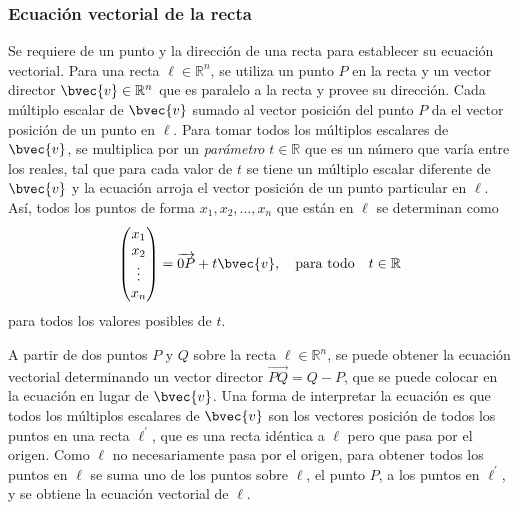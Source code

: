 \documentclass{fmbnotes}
\begin{document}
\subsubsection{Ecuación vectorial de la recta}
Se requiere de un punto y la dirección de una recta para establecer su ecuación vectorial. Para una recta \(\ell \in \mathbb{R}^{n}\), se utiliza un punto \(P\) en la recta y un vector director \(\bvec{v}\in \mathbb{R}^{n}\) que es paralelo a la recta y provee su dirección. Cada múltiplo escalar de \(\bvec{v}\) sumado al vector posición del punto \(P\) da el vector posición de un punto en \(\ell\). Para tomar todos los múltiplos escalares de \(\bvec{v}\), se multiplica por un \emph{parámetro} \(t \in \mathbb{R}\) que es un número que varía entre los reales, tal que para cada valor de \(t\) se tiene un múltiplo escalar diferente de \(\bvec{v}\) y la ecuación arroja el vector posición de un punto particular en \(\ell\). Así, todos los puntos de forma \(x_1, x_2, \ldots, x_n\) que están en \(\ell\) se determinan como
\[\begin{pmatrix}
x_1 \\ x_2 \\ \vdots \\ x_n
\end{pmatrix} =\overrightarrow{0P}+t \bvec{v}, \quad \text{para todo} \quad t \in \mathbb{R}\]
para todos los valores posibles de \(t\).

A partir de dos puntos \( P \) y \( Q \) sobre la recta \( \ell \in \mathbb{R}^{n} \), se puede obtener la ecuación vectorial determinando un vector director \(\overrightarrow{PQ}=Q-P\), que se puede colocar en la ecuación en lugar de \(\bvec{v}\). Una forma de interpretar la ecuación es que todos los múltiplos escalares de \( \bvec{v} \) son los vectores posición de todos los puntos en una recta \( \ell^{\prime} \), que es una recta idéntica a \( \ell \) pero que pasa por el origen. Como \( \ell \) no necesariamente pasa por el origen, para obtener todos los puntos en \(\ell\) se suma uno de los puntos sobre \( \ell \), el punto \(P\), a los puntos en \(\ell^{\prime}\), y se obtiene la ecuación vectorial de \(\ell\).
\end{document}
